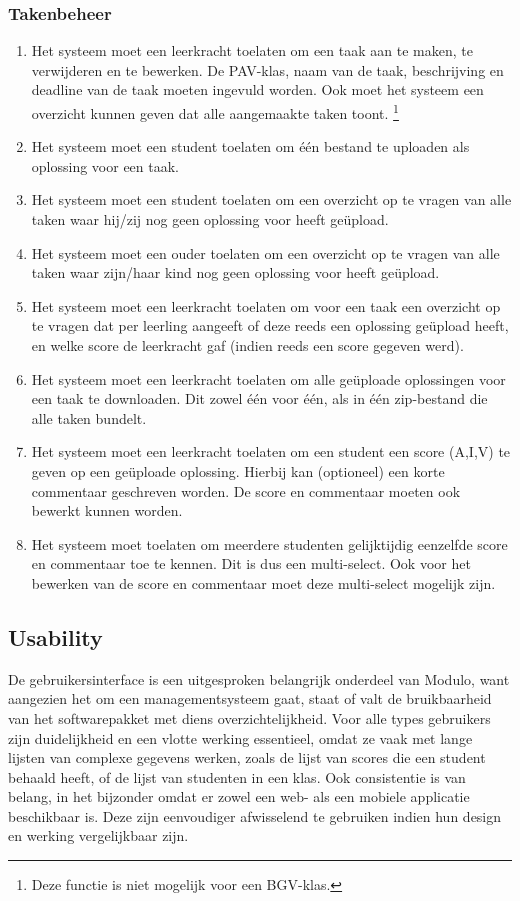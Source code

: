\documentclass[a4paper]{article}
\begin{document}
\subsubsection{Takenbeheer}
\begin{enumerate}[label=F\arabic*,resume]
\item Het systeem moet een leerkracht toelaten om een taak aan te maken, te verwijderen en te bewerken. De PAV-klas, naam van de taak, beschrijving en deadline van de taak moeten ingevuld worden. Ook moet het systeem een overzicht kunnen geven dat alle aangemaakte taken toont. \footnote{Deze functie is niet mogelijk voor een BGV-klas.}
\item Het systeem moet een student toelaten om één bestand te uploaden als oplossing voor een taak.
\item Het systeem moet een student toelaten om een overzicht op te vragen van alle taken waar hij/zij nog geen oplossing voor heeft geüpload.
\item Het systeem moet een ouder toelaten om een overzicht op te vragen van alle taken waar zijn/haar kind nog geen oplossing voor heeft geüpload.
\item Het systeem moet een leerkracht toelaten om voor een taak een overzicht op te vragen dat per leerling aangeeft of deze reeds een oplossing geüpload heeft, en welke score de leerkracht gaf (indien reeds een score gegeven werd).
\item Het systeem moet een leerkracht toelaten om alle geüploade oplossingen voor een taak te downloaden. Dit zowel één voor één, als in één zip-bestand die alle taken bundelt.
\item Het systeem moet een leerkracht toelaten om een student een score (A,I,V) te geven op een geüploade oplossing. Hierbij kan (optioneel) een korte commentaar geschreven worden. De score en commentaar moeten ook bewerkt kunnen worden.
\item Het systeem moet toelaten om meerdere studenten gelijktijdig eenzelfde score en commentaar toe te kennen. Dit is dus een multi-select. Ook voor het bewerken van de score en commentaar moet deze multi-select mogelijk zijn.
\end{enumerate}


\subsection{Usability}
De gebruikersinterface is een uitgesproken belangrijk onderdeel van Modulo, want aangezien het om een managementsysteem gaat, staat of valt de bruikbaarheid van het softwarepakket met diens overzichtelijkheid. Voor alle types gebruikers zijn duidelijkheid en een vlotte werking essentieel, omdat ze vaak met lange lijsten van complexe gegevens werken, zoals de lijst van scores die een student behaald heeft, of de lijst van studenten in een klas. Ook consistentie is van belang, in het bijzonder omdat er zowel een web- als een mobiele applicatie beschikbaar is. Deze zijn eenvoudiger afwisselend te gebruiken indien hun design en werking vergelijkbaar zijn.
\end{document}

